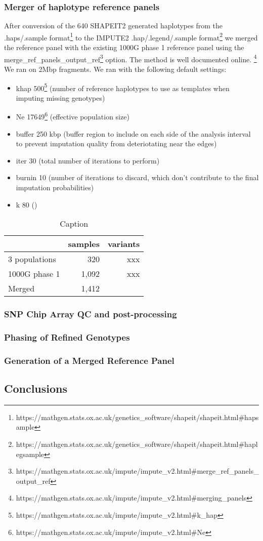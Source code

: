 \subsubsection{Merger of haplotype reference panels}
After conversion of the 640 SHAPEIT2 generated haplotypes from the .haps/.sample format\footnote{https://mathgen.stats.ox.ac.uk/genetics\_software/shapeit/shapeit.html\#hapsample} to the IMPUTE2 .hap/.legend/.sample format\footnote{https://mathgen.stats.ox.ac.uk/genetics\_software/shapeit/shapeit.html\#haplegsample} we merged the reference panel with the existing \gls{1000G} phase 1 reference panel using the \-merge\_ref\_panels\_output\_ref\footnote{https://mathgen.stats.ox.ac.uk/impute/impute\_v2.html\#\-merge\_ref\_panels\_output\_ref} option.
The method is well documented online.
\footnote{https://mathgen.stats.ox.ac.uk/impute/impute\_v2.html\#merging\_panels}
We ran on 2\gls{Mbp} fragments. We ran with the following default settings:
\begin{itemize}
\item \-khap 500\footnote{https://mathgen.stats.ox.ac.uk/impute/impute\_v2.html\#\-k\_hap} (number of reference haplotypes to use as templates when imputing missing genotypes)
\item \-Ne 17649\footnote{https://mathgen.stats.ox.ac.uk/impute/impute\_v2.html\#\-Ne} (effective population size\cite{Wright01031931}\cite{Wright1938})
\item \-buffer 250 \gls{kbp} (buffer region to include on each side of the analysis interval to prevent imputation quality from deteriotating near the edges)
\item \-iter 30 (total number of iterations to perform)
\item \-burnin 10 (number of iterations to discard, which don't contribute to the final imputation probabilities)
\item \-k 80 ()
\end{itemize}

\begin{table}[]
\centering
\begin{tabular}{l|r|r}
 & samples & variants \\ \hline
 3 populations & 320 & xxx \\
 1000G phase 1 & 1,092 & xxx \\
 Merged & 1,412 &  \
\end{tabular}
\caption{Caption}
\label{tab:my_label}
\end{table}

\subsubsection{SNP Chip Array QC and post-processing}
\subsubsection{Phasing of Refined Genotypes}
\subsubsection{Generation of a Merged Reference Panel}



\subsection{Conclusions}